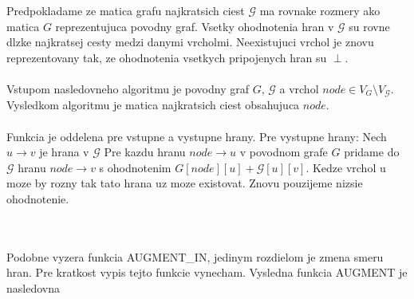 \documentclass[paper=a4, fontsize=11pt]{scrartcl} %
\numberwithin{equation}{section} %
\numberwithin{figure}{section} %
\numberwithin{table}{section} %
\begin{document}
Predpokladame ze matica grafu najkratsich ciest $\mathcal{G}$ ma rovnake rozmery ako matica $G$ reprezentujuca povodny graf. Vsetky ohodnotenia hran v $\mathcal{G}$ su rovne dlzke najkratsej cesty medzi danymi vrcholmi. Neexistujuci vrchol je znovu reprezentovany tak, ze ohodnotenia vsetkych pripojenych hran su $\perp$.\\
\ \\
Vstupom nasledovneho algoritmu je povodny graf $G$, $\mathcal{G}$ a vrchol $node \in V_{G} \setminus V_{\mathcal{G}}$. Vysledkom algoritmu je matica najkratsich ciest obsahujuca $node$.\\
\ \\
Funkcia je oddelena pre vstupne a vystupne hrany. Pre vystupne hrany:
Nech $u \to v$ je hrana v $\mathcal{G}$ Pre kazdu hranu $node \to u$ v povodnom grafe $G$ pridame do $\mathcal{G}$ hranu $node \to v$ s ohodnotenim $G[node][u] +\mathcal{G}[u][v]$. Kedze vrchol u moze by rozny tak tato hrana uz moze existovat. Znovu pouzijeme nizsie ohodnotenie.\\
\ \\
\begin{algorithmic}[1]
                        \EndIf
                    \EndIf
                \EndFor
            \EndIf
        \EndFor
        \State {}
    \EndFunction
\end{algorithmic}
\ \\
Podobne vyzera funkcia AUGMENT\_IN, jedinym rozdielom je zmena smeru hran. Pre kratkost vypis tejto funkcie vynecham. Vysledna funkcia AUGMENT je nasledovna\\
\ \\
\begin{algorithmic}[1]
        \State {}
    \EndFunction
\end{algorithmic}
\end{document}
